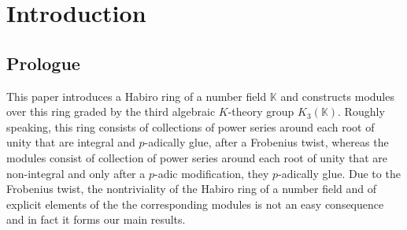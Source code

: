 \documentclass[12pt,reqno]{amsart}
\theoremstyle{definition}
\def\BK{\mathbb K}
\begin{document}
\begin{abstract}
  We introduce the Habiro ring of a number field $\BK$ and modules over it graded by
  $K_3(\BK)$. Elements of these modules are collections of power series at each
  complex root of unity that arithmetically glue with each other after applying
  a Frobenius endomorphism, and after dividing at each prime by a collection of
  series that depends solely on an element of the Bloch group.

  The main theorems of this paper concern number fields, their algebraic
  $K$-theory and its regulator maps (Borel, $p$-adic and \'etale), whereas the explicit
  collections of series are defined by a careful algebraic analysis of the infinite
  Pochhammer symbol at roots of unity. 
  The origin of the above
  mentioned power series comes from perturbative Chern--Simons theory and by
  expansions of the admissible series of Kontsevich--Soibelman, both ultimately related
  to the infinite Pochhammer symbol.
  This link suggests that some
  Donaldson-Thomas invariants have arithmetic meaning and that some elements of
  the Habiro ring of a number field have enumerative meaning.
\end{abstract}

\maketitle

{\footnotesize
\tableofcontents
}


\section{Introduction}
\label{sec.intro}

\subsection{Prologue}
\label{sub.prologue}

This paper introduces a Habiro ring of a number field $\BK$ and constructs modules
over this ring graded by the third algebraic $K$-theory group $K_3(\BK)$. Roughly
speaking, this ring consists of collections of power series around each root
of unity that are integral and $p$-adically glue, after a
Frobenius twist, whereas the modules consist of collection of power series around
each root of unity that are non-integral and only after a $p$-adic modification, they
$p$-adically glue. Due to the Frobenius twist, the nontriviality of the Habiro
ring of a number field and of explicit elements of the the corresponding modules is
not an easy consequence and in fact it forms our main results.
\end{document}
